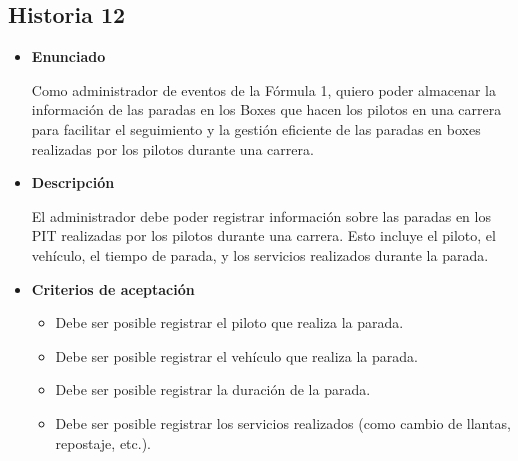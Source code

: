 \documentclass{article}
\begin{document}
	\subsection{Historia 12}
	\begin{itemize}
		
		\item \large{\textbf{Enunciado}}
		\begin{description}
			Como administrador de eventos de la Fórmula 1, quiero poder almacenar la información de las paradas en los Boxes que hacen los pilotos en una carrera para facilitar el seguimiento y la gestión eficiente de las paradas en boxes realizadas por los pilotos durante una carrera.
			
		\end{description}
		
		\item \large{\textbf{Descripción}}
		\begin{description}
			El administrador debe poder registrar información sobre las paradas en los PIT realizadas por los pilotos durante una carrera. Esto incluye el piloto, el vehículo, el tiempo de parada, y los servicios realizados durante la parada.
			
		\end{description}
		
		\item \large{\textbf{Criterios de aceptación}}
		\begin{itemize}
			\item Debe ser posible registrar el piloto que realiza la parada.
			\item Debe ser posible registrar el vehículo que realiza la parada. 
			\item Debe ser posible registrar la duración de la parada.
			\item Debe ser posible registrar los servicios realizados (como cambio de llantas, repostaje, etc.).
			
		\end{itemize}
		
	\end{itemize}
	
\end{document}
